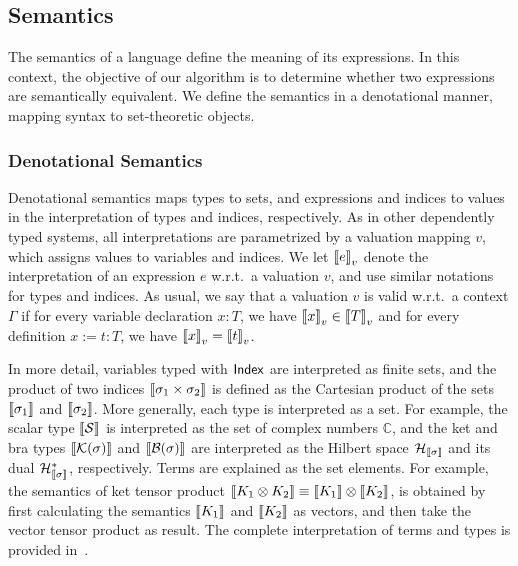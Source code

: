 





\subsection{Semantics}

The semantics of a language define the meaning of its expressions. In this context, the objective of our algorithm is to determine whether two expressions are semantically equivalent. We define the semantics in a denotational manner, mapping syntax to set-theoretic objects.

\subsubsection{Denotational Semantics}
Denotational semantics maps types to sets, and expressions and
indices to values in the interpretation of types and indices,
respectively. As in other dependently typed systems, all
interpretations are parametrized by a valuation mapping \( v \), which
assigns values to variables and indices. We let \( {\llbracket e \rrbracket}_v \) denote
the interpretation of an expression $e$ w.r.t.\, a valuation \( v \),
and use similar notations for types and indices. As usual, we say that
a valuation \( v \) is valid w.r.t.\, a context $\Gamma$ if for every
variable declaration $x:T$, we have \( {\llbracket x \rrbracket}_v \in{\llbracket T \rrbracket}_v \) and
for every definition $x:= t: T$, we have  \( {\llbracket x \rrbracket}_v={\llbracket t \rrbracket}_v \).


In more detail, variables typed with \( \mathsf{Index} \) are interpreted as
finite sets, and the product of two indices \( {\llbracket \sigma_1 \times
  \sigma_2 \rrbracket} \) is defined as the Cartesian product of the sets \(
{\llbracket \sigma_1 \rrbracket} \) and \( {\llbracket \sigma_2 \rrbracket} \). More generally, each type
is interpreted as a set. For example, the scalar type \( {\llbracket \mathcal{S} \rrbracket}
\) is interpreted as the set of complex numbers \( \mathbb{C} \), and
the ket and bra types \( {\llbracket \mathcal{K}(\sigma) \rrbracket} \) and \(
{\llbracket \mathcal{B}(\sigma) \rrbracket} \) are interpreted as the Hilbert space \(
\mathcal{H}_{{\llbracket \sigma \rrbracket}} \) and its dual \(
\mathcal{H}_{{\llbracket \sigma \rrbracket}}^* \), respectively. Terms are explained as
the set elements. For example, the semantics of ket tensor product
${\llbracket K_1 \otimes K_2 \rrbracket} \equiv {\llbracket K_1 \rrbracket} \otimes {\llbracket K_2 \rrbracket}$, is
obtained by first calculating the semantics ${\llbracket K_1 \rrbracket}$ and
${\llbracket K_2 \rrbracket}$ as vectors, and then take the vector tensor product as
result.  The complete interpretation of terms and types is provided
in~.

